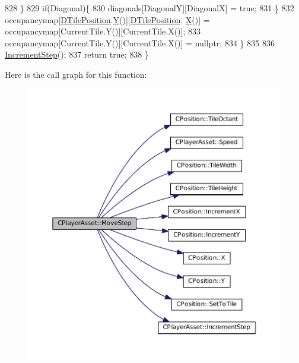 \begin{DoxyCode}
828         \}
829         \textcolor{keywordflow}{if}(Diagonal)\{
830             diagonals[DiagonalY][DiagonalX] = \textcolor{keyword}{true};
831         \}
832         occupancymap[\hyperlink{classCPlayerAsset_a5b59a9d3b7db8c7fa194b80dafb96186}{DTilePosition}.\hyperlink{classCPosition_a1aa8a30e2f08dda1f797736ba8c13a87}{Y}()][\hyperlink{classCPlayerAsset_a5b59a9d3b7db8c7fa194b80dafb96186}{DTilePosition}.
      \hyperlink{classCPosition_a9a6b94d3b91df1492d166d9964c865fc}{X}()] = occupancymap[CurrentTile.Y()][CurrentTile.X()];
833         occupancymap[CurrentTile.Y()][CurrentTile.X()] = \textcolor{keyword}{nullptr};
834     \}
835     
836     \hyperlink{classCPlayerAsset_aa1d39b408fd5aa11f2c3a19ef4d3895d}{IncrementStep}();
837     \textcolor{keywordflow}{return} \textcolor{keyword}{true};
838 \}
\end{DoxyCode}
Here is the call graph for this function\+:\nopagebreak
\begin{figure}[H]
\begin{center}
\leavevmode
\includegraphics[width=350pt]{classCPlayerAsset_a4c8ef6c0049b48045c2ba95d398dbc05_cgraph}
\end{center}
\end{figure}
\hypertarget{classCPlayerAsset_aa7723b668d4278f23eb28ca8b6043192}{}\label{classCPlayerAsset_aa7723b668d4278f23eb28ca8b6043192} 
